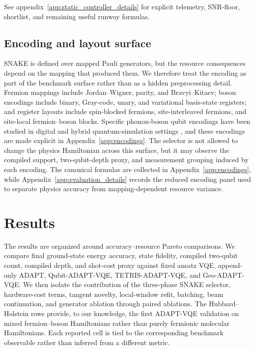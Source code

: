 \documentclass[
  reprint,
  amsmath,
  amssymb,
  aps,
  pra,
  nofootinbib,
  superscriptaddress,
  floatfix
]{revtex4-2}
\begin{document}
See appendix~\ref{app:static_controller_details} for explicit telemetry, SNR-floor, shortlist, and remaining useful runway formulas.


\subsection{Encoding and layout surface}
\label{sec:encoding_surface}

SNAKE is defined over mapped Pauli generators, but the resource consequences depend on the mapping that produced them. We therefore treat the encoding as part of the benchmark surface rather than as a hidden preprocessing detail. Fermion mappings include Jordan--Wigner, parity, and Bravyi--Kitaev; boson encodings include binary, Gray-code, unary, and variational basis-state registers; and register layouts include spin-blocked fermions, site-interleaved fermions, and site-local fermion--boson blocks. Specific phonon-boson qubit encodings have been studied in digital and hybrid quantum-simulation settings \cite{Macridin2018,Sawaya2020,Li2023,Denner2023}, and these encodings are made explicit in Appendix~\ref{app:encodings}. The selector is not allowed to change the physics Hamiltonian across this surface, but it may observe the compiled support, two-qubit-depth proxy, and measurement grouping induced by each encoding. The canonical formulas are collected in Appendix~\ref{app:encodings}, while Appendix~\ref{app:evaluation_details} records the reduced encoding panel used to separate physics accuracy from mapping-dependent resource variance.


\section{Results}
\label{sec:results}
\label{sec:benchmarks}

The results are organized around accuracy--resource Pareto comparisons. We compare final ground-state energy accuracy, state fidelity, compiled two-qubit count, compiled depth, and shot-cost proxy against fixed ansatz VQE, append-only ADAPT, Qubit-ADAPT-VQE, TETRIS-ADAPT-VQE, and Geo-ADAPT-VQE. We then isolate the contribution of the three-phase SNAKE selector, hardware-cost terms, tangent novelty, local-window refit, batching, beam continuation, and generator ablation through paired ablations. The Hubbard--Holstein rows provide, to our knowledge, the first ADAPT-VQE validation on mixed fermion--boson Hamiltonians rather than purely fermionic molecular Hamiltonians. Each reported cell is tied to the corresponding benchmark observable rather than inferred from a different metric.
\end{document}
